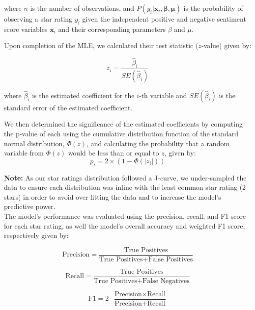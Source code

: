 \documentclass[sn-mathphys,Numbered]{sn-jnl}%
\theoremstyle{thmstyleone}%
\theoremstyle{thmstyletwo}%
\theoremstyle{thmstylethree}%
\begin{document}
where $n$ is the number of observations, and $P(y_i | \textbf{x}_i, \boldsymbol{\beta}, \boldsymbol{\mu})$ is the probability of observing a star rating $y_i$ given the independent positive and negative sentiment score variables $\textbf{x}_i$ and their corresponding parameters $\beta$ and $\mu$.

Upon completion of the MLE, we calculated their test statistic ($z$-value) given by:

\begin{equation}
z_i = \frac{\hat{\beta}_i}{SE(\hat{\beta}_i)}
\end{equation}

where $\hat{\beta}_i$ is the estimated coefficient for the $i$-th variable and $SE(\hat{\beta}_i)$ is the standard error of the estimated coefficient. 

We then determined the significance of the estimated coefficients by computing the p-value of each using the cumulative distribution function of the standard normal distribution, $\Phi(z)$, and calculating the probability that a random variable from $\Phi(z)$ would be less than or equal to $z$, given by:
\begin{equation}
p_i = 2 \times (1 - \Phi(|z_i|))
\end{equation}

\textbf{Note:} As our star ratings distribution followed a J-curve, we under-sampled the data to ensure each distribution was inline with the least common star rating (2 stars) in order to avoid over-fitting the data and to increase the model's predictive power.\\

The model's performance was evaluated using the precision, recall, and F1 score for each star rating, as well the model's overall accuracy and weighted F1 score, respectively given by:

\begin{equation}
\text{Precision} = \frac{\text{True Positives}}{\text{True Positives} + \text{False Positives}}
\end{equation}

\begin{equation}
\text{Recall} = \frac{\text{True Positives}}{\text{True Positives} + \text{False Negatives}}
\end{equation}

\begin{equation}
\text{F1} = 2 \cdot \frac{\text{Precision} \times \text{Recall}}{\text{Precision} + \text{Recall}}
\end{equation}
\end{document}

